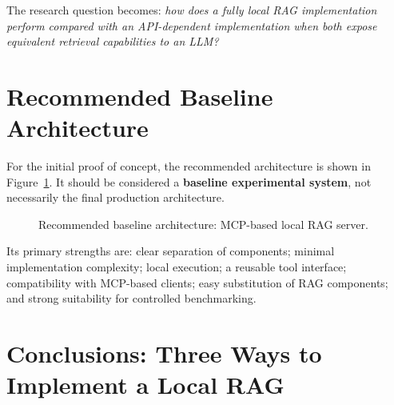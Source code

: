 \documentclass[11pt,a4paper]{article}
\begin{document}
The research question becomes: \emph{how does a fully local RAG implementation
perform compared with an API-dependent implementation when both expose
equivalent retrieval capabilities to an LLM?}

\section{Recommended Baseline Architecture}
\label{sec:architecture-baseline}

For the initial proof of concept, the recommended architecture is shown in
Figure~\ref{fig:baseline}. It should be considered a \textbf{baseline
experimental system}, not necessarily the final production architecture.

\begin{figure}[htbp]
\centering
{}
\caption{Recommended baseline architecture: MCP-based local RAG server.}
\label{fig:baseline}
\end{figure}

Its primary strengths are: clear separation of components; minimal
implementation complexity; local execution; a reusable tool interface;
compatibility with MCP-based clients; easy substitution of RAG components; and
strong suitability for controlled benchmarking.

\section{Conclusions: Three Ways to Implement a Local RAG}
\label{sec:conclusions}
\end{document}

